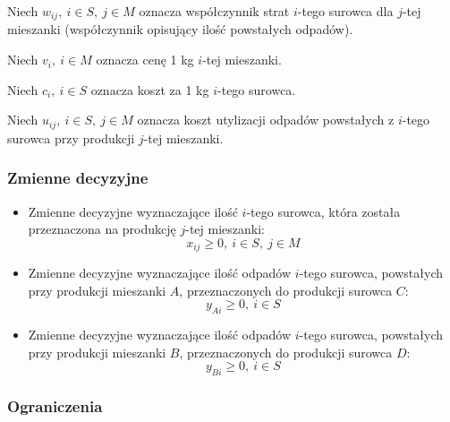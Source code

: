 \documentclass{article}
\begin{document}
        Niech $w_{ij}, \ i \in S, \ j \in M$ oznacza współczynnik strat $i$-tego surowca dla $j$-tej mieszanki (współczynnik opisujący ilość powstałych odpadów).

        Niech $v_i, \ i \in M$ oznacza cenę 1 kg $i$-tej mieszanki.
        
        Niech $c_i, \ i \in S$ oznacza koszt za 1 kg $i$-tego surowca.

        Niech $u_{ij}, \ i \in S, \ j \in M$ oznacza koszt utylizacji odpadów powstałych z $i$-tego surowca przy produkcji $j$-tej mieszanki.

    \subsubsection{Zmienne decyzyjne}

        \begin{itemize}
            \item Zmienne decyzyjne wyznaczające ilość $i$-tego surowca, która została przeznaczona na produkcję $j$-tej mieszanki:
                $$x_{ij} \geq 0, \ i \in S, \ j \in M$$

            \item Zmienne decyzyjne wyznaczające ilość odpadów $i$-tego surowca, powstałych przy produkcji mieszanki $A$, przeznaczonych do 
                produkcji surowca $C$:
                $$y_{Ai} \geq 0, \ i \in S$$

            \item Zmienne decyzyjne wyznaczające ilość odpadów $i$-tego surowca, powstałych przy produkcji mieszanki $B$, przeznaczonych do 
                produkcji surowca $D$:
                $$y_{Bi} \geq 0, \ i \in S$$
        \end{itemize}


    \subsubsection{Ograniczenia}
\end{document}

